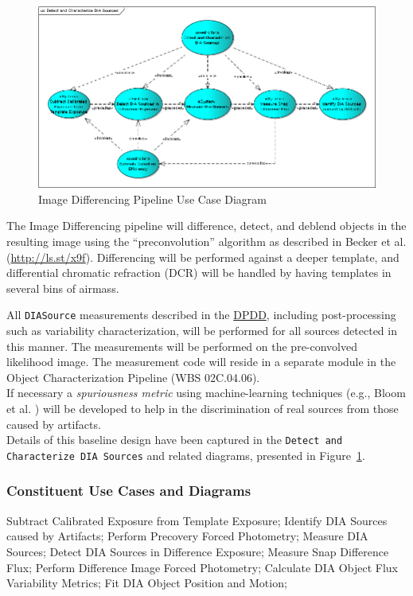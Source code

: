 \documentclass[12pt]{article}
\newcommand{\code}[1]{\texttt{#1}}
\newcommand{\DIASource}{\code{DIASource}\xspace}
\newcommand{\ds}[2]{{\color{blue} \href{https://docushare.lsstcorp.org/docushare/dsweb/Get/#1}{#2}}\xspace}
\newcommand{\DPDD}{\ds{LSE-163}{DPDD}}
\newcommand{\wbsObjChar}{WBS 02C.04.06}
\newcommand{\uc}[1]{{\tt #1}}
\begin{document}
\begin{figure}
\includegraphics[angle=0,scale=0.44]{detect_and_characterize_dia_sources.png}
\caption{Image Differencing Pipeline Use Case Diagram\label{fig:diffimUML}}
\end{figure}

The Image Differencing pipeline will difference, detect, and deblend objects in the resulting image using the ``preconvolution'' algorithm as described in Becker et al. (\url{http://ls.st/x9f}).
Differencing will be performed against a deeper template, and differential chromatic refraction (DCR) will be handled by having templates in several bins of airmass.

All \DIASource measurements described in the \DPDD, including post-processing such as variability characterization, will be performed for all sources detected in this manner. The measurements will be performed on the pre-convolved likelihood image. The measurement code will reside in a separate module in the Object Characterization Pipeline (\wbsObjChar).
\\

If necessary a {\em spuriousness metric} using machine-learning techniques (e.g., Bloom et al. \cite{Bloom12}) will be developed to help in the discrimination of real sources from those caused by artifacts.
\\

Details of this baseline design have been captured in the \uc{Detect and Characterize DIA Sources} and related diagrams, presented in Figure~\ref{fig:diffimUML}.

\subsubsection{Constituent Use Cases and Diagrams}

Subtract Calibrated Exposure from Template Exposure; Identify DIA Sources caused by Artifacts; Perform Precovery Forced Photometry; Measure DIA Sources; Detect DIA Sources in Difference Exposure; Measure Snap Difference Flux; Perform Difference Image Forced Photometry; Calculate DIA Object Flux Variability Metrics; Fit DIA Object Position and Motion;
\end{document}
